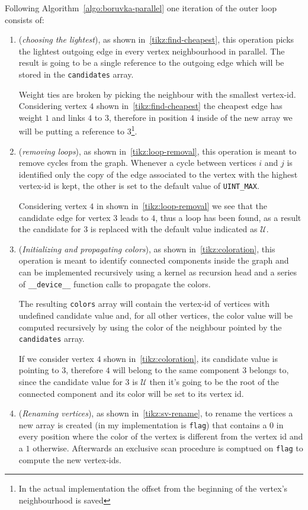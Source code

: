 \documentclass[a4paper,10pt]{article}
\begin{document}
Following Algorithm~\ref{algo:boruvka-parallel} one iteration of the outer loop consists of:
\begin{enumerate}
	\item\label{item:choose-lightest} (\textit{choosing the lightest}), as shown in~\ref{tikz:find-cheapest}, this operation picks the lightest outgoing edge in every vertex neighbourhood in parallel. The result is going to be a single reference to the outgoing edge which will be stored in the \texttt{candidates} array.
	
		Weight ties are broken by picking the neighbour with the smallest vertex-id. Considering
		vertex $4$ shown in~\ref{tikz:find-cheapest} the cheapest edge has weight $1$ and
		links $4$ to $3$, therefore in position $4$ inside of the new array we will be
		putting a reference to $3$\footnote{In the actual implementation the offset from the
		beginning of the vertex's neighbourhood is saved}.
	\item\label{item:mirror-removal} (\textit{removing loops}), as shown in~\ref{tikz:loop-removal}, this operation is meant to remove cycles from the graph. Whenever a cycle between vertices $i$ and $j$ is identified only the copy of the edge associated to the vertex with the highest vertex-id is kept, the other is set to the default value of \texttt{UINT\_MAX}.

		Considering vertex $4$ in shown in~\ref{tikz:loop-removal} we see that the candidate
		edge for vertex $3$ leads to $4$, thus a loop has been found, as a result the
		candidate for $3$ is replaced with the default value indicated as $\mathcal{U}$.
	\item\label{item:coloration} (\textit{Initializing and propagating colors}), as shown in~\ref{tikz:coloration}, this operation is meant to identify connected components inside the graph and can be implemented recursively using a kernel as recursion head and a series of \texttt{\_\_device\_\_} function calls to propagate the colors.
	
	The resulting \texttt{colors} array will contain the vertex-id of vertices with undefined candidate value and, for all other vertices, the color value will be computed recursively by using the color of the neighbour pointed by the \texttt{candidates} array.

		If we consider vertex $4$ shown in~\ref{tikz:coloration}, its candidate value is
		pointing to $3$, therefore $4$ will belong to the same component $3$ belongs to,
		since the candidate value for $3$ is $\mathcal{U}$ then it's going to be the root of the
		connected component and its color will be set to its vertex id.
	\item\label{item:vertex-rename} (\textit{Renaming vertices}), as shown in~\ref{tikz:sv-rename}, to rename the vertices a new array is created (in my implementation is \texttt{flag}) that contains a $0$ in every position where the color of the vertex is different from the vertex id and a $1$ otherwise. Afterwards an exclusive scan procedure is comptued on \texttt{flag} to compute the new vertex-ids.


\end{enumerate}
\end{document}

